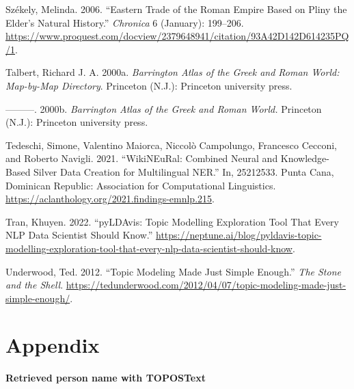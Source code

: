\documentclass[
  12pt,
]{article}
\newlength{\cslhangindent}
\newlength{\cslentryspacingunit} %
\newenvironment{CSLReferences}[2] %
 {%
  \setlength{\parindent}{0pt}
  \ifodd #1
  \let\oldpar\par
  \def\par{\hangindent=\cslhangindent\oldpar}
  \fi
  \setlength{\parskip}{#2\cslentryspacingunit}
 }%
 {}
\begin{document}
\begin{CSLReferences}{1}{0}
\leavevmode{}%
Székely, Melinda. 2006. {``Eastern {Trade} of the {Roman} {Empire} Based
on {Pliny} the {Elder}'s {Natural} {History}.''} \emph{Chronica} 6
(January): 199--206.
\url{https://www.proquest.com/docview/2379648941/citation/93A42D142D614235PQ/1}.

\leavevmode{}%
Talbert, Richard J. A. 2000a. \emph{Barrington Atlas of the {Greek} and
{Roman} World: Map-by-Map Directory}. Princeton (N.J.): Princeton
university press.

\leavevmode{}%
---------. 2000b. \emph{Barrington Atlas of the {Greek} and {Roman}
World.} Princeton (N.J.): Princeton university press.

\leavevmode{}%
Tedeschi, Simone, Valentino Maiorca, Niccolò Campolungo, Francesco
Cecconi, and Roberto Navigli. 2021. {``WikiNEuRal: Combined Neural and
Knowledge-Based Silver Data Creation for Multilingual NER.''} In,
25212533. Punta Cana, Dominican Republic: Association for Computational
Linguistics. \url{https://aclanthology.org/2021.findings-emnlp.215}.

\leavevmode{}%
Tran, Khuyen. 2022. {``pyLDAvis: Topic Modelling Exploration Tool That
Every NLP Data Scientist Should Know.''}
\url{https://neptune.ai/blog/pyldavis-topic-modelling-exploration-tool-that-every-nlp-data-scientist-should-know}.

\leavevmode{}%
Underwood, Ted. 2012. {``Topic Modeling Made Just Simple Enough.''}
\emph{The Stone and the Shell}.
\url{https://tedunderwood.com/2012/04/07/topic-modeling-made-just-simple-enough/}.

\end{CSLReferences}

\newpage

\hypertarget{appendix}{%
\section*{Appendix}\label{appendix}}

\textbf{Retrieved person name with TOPOSText}
\end{document}

